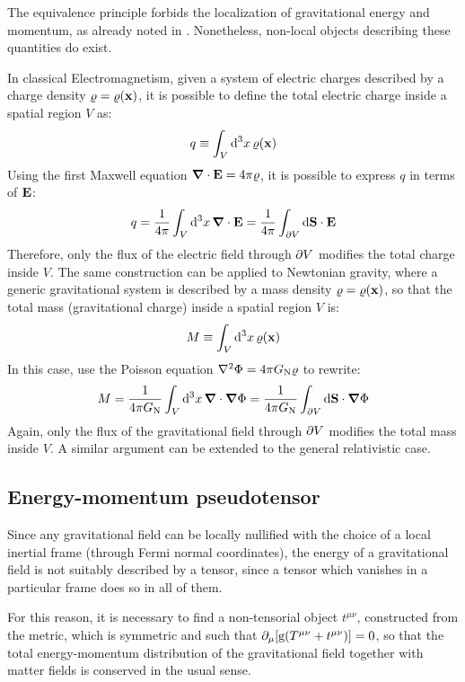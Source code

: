 The equivalence principle forbids the localization of gravitational energy and momentum, as already noted in . Nonetheless, non-local objects describing these quantities do exist.

In classical Electromagnetism, given a system of electric charges described by a charge density $ \varrho = \varrho(\mathbf{x}) $, it is possible to define the total electric charge inside a spatial region $ V $ as:
\begin{equation*}
  q \equiv \int_V \mathrm{d}^3x \, \varrho(\mathbf{x})
\end{equation*}
Using the first Maxwell equation $ \boldsymbol{\nabla}\cdot \mathbf{E} = 4\pi \varrho $, it is possible to express $ q $ in terms of $ \mathbf{E} $:
\begin{equation*}
  q = \frac{1}{4\pi} \int_V \mathrm{d}^3x \, \boldsymbol{\nabla}\cdot \mathbf{E} = \frac{1}{4\pi} \int_{\partial V} \mathrm{d}\mathbf{S} \cdot \mathbf{E}
\end{equation*}
Therefore, only the flux of the electric field through $ \partial V $ modifies the total charge inside $ V $. The same construction can be applied to Newtonian gravity, where a generic gravitational system is described by a mass density $ \varrho = \varrho(\mathbf{x}) $, so that the total mass (gravitational charge) inside a spatial region $ V $ is:
\begin{equation*}
  M \equiv \int_V \mathrm{d}^3x \, \varrho(\mathbf{x})
\end{equation*}
In this case, use the Poisson equation $ \nabla^2 \Phi = 4 \pi G_\text{N} \varrho $ to rewrite:
\begin{equation*}
  M = \frac{1}{4\pi G_\text{N}} \int_V \mathrm{d}^3x \, \boldsymbol{\nabla}\cdot \boldsymbol{\nabla} \Phi = \frac{1}{4\pi G_\text{N}} \int_{\partial V} \mathrm{d}\mathbf{S} \cdot \boldsymbol{\nabla} \Phi
\end{equation*}
Again, only the flux of the gravitational field through $ \partial V $ modifies the total mass inside $ V $. A similar argument can be extended to the general relativistic case.

\subsection{Energy-momentum pseudotensor}
\label{ssec:pseudo-emt}

Since any gravitational field can be locally nullified with the choice of a local inertial frame (through Fermi normal coordinates), the energy of a gravitational field is not suitably described by a tensor, since a tensor which vanishes in a particular frame does so in all of them.

For this reason, it is necessary to find a non-tensorial object $ t^{\mu \nu} $, constructed from the metric, which is symmetric and such that $ \partial_\mu [ \mathrm{g} (T^{\mu \nu} + t^{\mu \nu}) ] = 0 $, so that the total energy-momentum distribution of the gravitational field together with matter fields is conserved in the usual sense\footnotemark.

